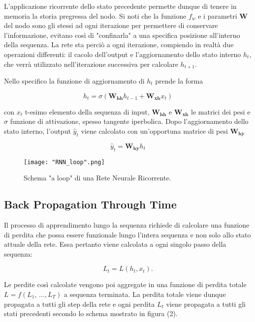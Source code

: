 \documentclass[10pt,letterpaper]{article}
\begin{document}
L'applicazione ricorrente dello stato precedente permette dunque di tenere in memoria la storia pregressa del nodo. Si noti che la funzione $f_w$ e i parametri $\textbf{W}$ del nodo sono gli stessi ad ogni iterazione per permettere di conservare l'informazione, evitano così di "confinarla" a una specifica posizione all'interno della sequenza. La rete sta perciò a ogni iterazione, compiendo in realtà due operazioni differenti: il cacolo dell'output e l'aggiornamento dello stato interno $h_t$, che verrà utilizzato nell'iterazione successiva per calcolare $h_{t+1}$.

Nello specifico la funzione di aggiornamento di $h_t$ prende la forma

\begin{equation}
h_t =\sigma(\textbf{W}_{\textbf{hh}}h_{t-1} + \textbf{W}_{\textbf{xh}}x_t)
\end{equation}

con $x_t$ t-esimo elemento della sequenza di input, $\textbf{W}_{\textbf{hh}}$ e $\textbf{W}_{\textbf{xh}}$ le matrici dei pesi e $\sigma$ funzione di attivazione, spesso tangente iperbolica. Dopo l'aggiornamento dello stato interno, l'output $\hat{y}_t$ viene calcolato con un'opportuna matrice di pesi $\textbf{W}_{\textbf{hy}}$

\begin{equation}
\hat{y}_t= \textbf{W}_{\textbf{hy}}h_t
\end{equation}

\begin{figure}[h!]
	\centering
	\texttt{[image: "RNN\_loop".png]}
	\caption{Schema "a loop" di una Rete Neurale Ricorrente.}
	\label{fig:screen1}
\end{figure}

\subsection{Back Propagation Through Time}

Il processo di apprendimento lungo la sequenza richiede di calcolare una funzione di perdita che possa essere funzionale lungo l'intera sequenza e non solo allo stato attuale della rete. Essa pertanto viene calcolata a ogni singolo passo della sequenza:

\begin{equation}
L_t = L(h_t,x_t).
\end{equation}

Le perdite così calcolate vengono poi aggregate in una funzione di perdita totale $L = f(L_1,\,...,L_T)$ a sequenza terminata. La perdita totale viene dunque propagata a tutti gli step della rete e ogni perdita $L_t$ viene propagata a tutti gli stati precedenti secondo lo schema mostrato in figura (2).
\end{document}

